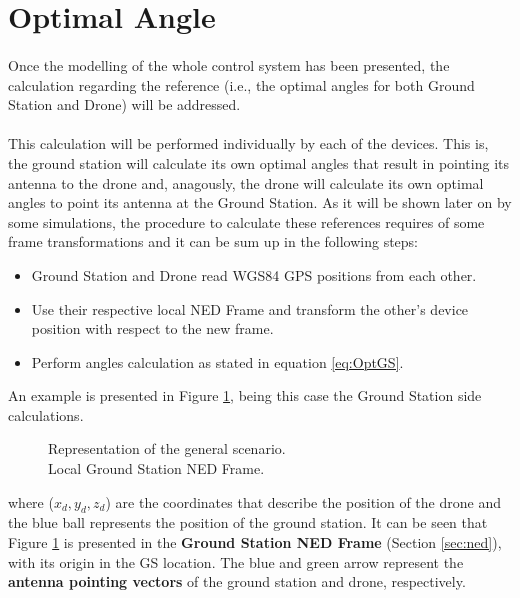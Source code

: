 \section{Optimal Angle}\label{sec:opt_angle}
\paragraph{} Once the modelling of the whole control system has been presented, the calculation regarding the reference (i.e., the optimal angles for both Ground Station and Drone) will be addressed.

\paragraph{} This calculation will be performed individually by each of the devices. This is, the ground station will calculate its own optimal angles that result in pointing its antenna to the drone and, anagously, the drone will calculate its own optimal angles to point its antenna at the Ground Station.
As it will be shown later on by some simulations, the procedure to calculate these references requires of some frame transformations and it can be sum up in the following steps:
\begin{itemize}
\item{Ground Station and Drone read WGS84 GPS positions from each other.}
\item{Use their respective local NED Frame and transform the other's device position with respect to the new frame.}
\item{Perform angles calculation as stated in equation \ref{eq:OptGS}.}
\end{itemize}

An example is presented in Figure \ref{fig:Scenario1}, being this case the Ground Station side calculations.
\begin{figure}[H]
   \centering
     
    \caption{Representation of the general scenario. \\Local Ground Station NED Frame.}
    \label{fig:Scenario1}
\end{figure}
where ($x_d,y_d,z_d$) are the coordinates that describe the position of the drone and the blue ball represents the position of the ground station. It can be seen that Figure \ref{fig:Scenario1} is presented in the \textbf{Ground Station NED Frame} (Section \ref{sec:ned}), with its origin in the GS location.
The blue and green arrow represent the \textbf{antenna pointing vectors} of the ground station and drone, respectively.

